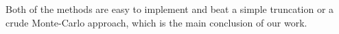 Both of the methods are easy to implement and beat a simple truncation or a crude Monte-Carlo approach, which is the main conclusion of our work.
